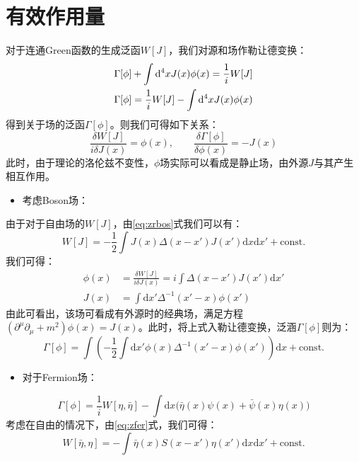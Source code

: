 \section{有效作用量}
\label{sc:effact}
对于连通Green函数的生成泛函$W[J]$，我们对源和场作勒让德变换：
\begin{align}
&\Gamma[\phi]+\int\mathrm{d}^4xJ(x)\phi(x)=\frac{1}{i}W[J]\notag\\
&\Gamma[\phi]=\frac{1}{i}W[J]-\int\mathrm{d}^4xJ(x)\phi(x)
\label{eq:effact}
\end{align}
得到关于场的泛函$\Gamma[\phi]$。则我们可得如下关系：
\begin{equation}
\frac{\delta W[J]}{i\delta J(x)}=\phi(x),\qquad\frac{\delta\Gamma[\phi]}{\delta\phi(x)}=-J(x)
\end{equation}
此时，由于理论的洛伦兹不变性，$\phi$场实际可以看成是静止场，由外源$J$与其产生相互作用。
\begin{itemize}
	\item 考虑Boson场：
\end{itemize}
由于对于自由场的$W[J]$，由\eqref{eq:zrbos}式我们可以有：
\begin{equation}
W[J]=-\frac{1}{2}\int J(x)\Delta(x-x')J(x')\mathrm{d}x\mathrm{d}x' + \text{const.}\label{eq:congreen}
\end{equation}
我们可得：
\begin{align}
\phi(x)&=\frac{\delta W[J]}{i\delta J(x)}=i\int \Delta(x-x')J(x')\mathrm{d}x'\\
J(x)&=\int\mathrm{d}x'\Delta^{-1}(x'-x)\phi(x')
\end{align}
由此可看出，该场可看成有外源时的经典场，满足方程$(\partial^\mu\partial_\mu+m^2)\phi(x)=J(x)$。此时，将上式入勒让德变换，泛涵$\Gamma[\phi]$则为：
\begin{equation}
\Gamma[\phi]=\int\left(-\frac{1}{2}\int\mathrm{d}x'\phi(x)\Delta^{-1}(x'-x)\phi(x')\right)\mathrm{d}x+\text{const.}
\end{equation}
\begin{itemize}
\item 对于Fermion场：
\end{itemize}
\begin{equation}
\Gamma[\phi]=\frac{1}{i}W[\eta,\bar{\eta}]-\int\mathrm{d}x \Big(\bar{\eta}(x)\psi(x)+\bar{\psi}(x)\eta(x)\Big)
\end{equation}
考虑在自由的情况下，由\eqref{eq:zfer}式，我们可得：
\begin{equation}
W[\bar{\eta},\eta]=-\int\bar{\eta}(x)S(x-x')\eta(x')\mathrm{d}x\mathrm{d}x'+\text{const.}
\end{equation}
